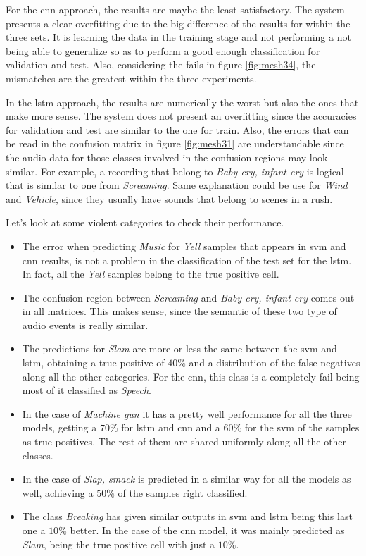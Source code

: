 	For the \acrshort{cnn} approach, the results are maybe the least satisfactory. The system presents a clear overfitting due to the big difference of the results for within the three sets. It is learning the data in the training stage and not performing a not being able to generalize so as to perform a good enough classification for validation and test. Also, considering the fails in figure \ref{fig:mesh34}, the mismatches are the greatest within the three experiments.
	
	In the \acrshort{lstm} approach, the results are numerically the worst but also the ones that make more sense. The system does not present an overfitting since the accuracies for validation and test are similar to the one for train. Also, the errors that can be read in the confusion matrix in figure \ref{fig:mesh31} are understandable since the audio data for those classes involved in the confusion regions may look similar. For example, a recording that belong to \textit{Baby cry, infant cry} is logical that is similar to one from \textit{Screaming}. Same explanation could be use for \textit{Wind} and \textit{Vehicle}, since they usually have sounds that belong to scenes in a rush.
	
	Let's look at some violent categories to check their performance. 
	
	\begin{itemize}
		\item The error when predicting \textit{Music} for \textit{Yell} samples that appears in \acrshort{svm} and \acrshort{cnn} results, is not a problem in the classification of the test set for the \acrshort{lstm}. In fact, all the \textit{Yell} samples belong to the true positive cell.
		\item The confusion region between \textit{Screaming} and \textit{Baby cry, infant cry} comes out in all matrices. This makes sense, since the semantic of these two type of audio events is really similar.
		\item The predictions for \textit{Slam} are more or less the same between the \acrshort{svm} and \acrshort{lstm}, obtaining a true positive of $40\%$ and a distribution of the false negatives along all the other categories. For the \acrshort{cnn}, this class is a completely fail being most of it classified as \textit{Speech}.
		\item In the case of \textit{Machine gun} it has a pretty well performance for all the three models, getting a $70\%$ for \acrshort{lstm} and \acrshort{cnn} and a $60\%$ for the \acrshort{svm} of the samples as true positives. The rest of them are shared uniformly along all the other classes.
		\item In the case of \textit{Slap, smack} is predicted in a similar way for all the models as well, achieving a $50\%$ of the samples right classified.
		\item The class \textit{Breaking} has given similar outputs in \acrshort{svm} and \acrshort{lstm} being this last one a $10\%$ better. In the case of the \acrshort{cnn} model, it was mainly predicted as \textit{Slam}, being the true positive cell with just a $10\%$.
	\end{itemize}
	
